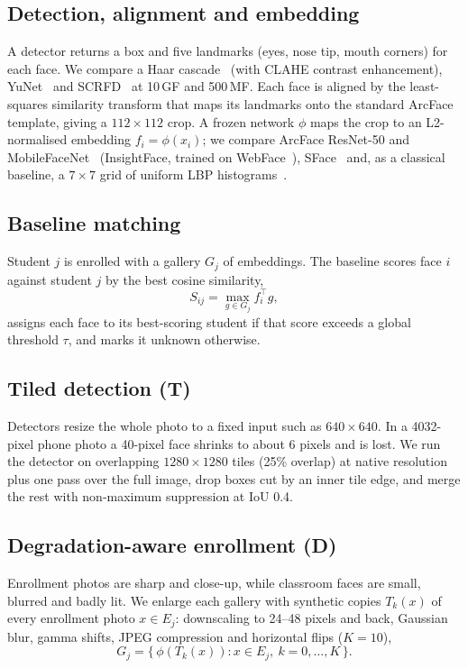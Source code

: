 \documentclass[conference,a4paper]{IEEEtran}
\begin{document}
\subsection{Detection, alignment and embedding}
A detector returns a box and five landmarks (eyes, nose tip, mouth corners) for each face. We compare a Haar cascade~\cite{viola} (with CLAHE contrast enhancement), YuNet~\cite{yunet} and SCRFD~\cite{scrfd} at 10\,GF and 500\,MF. Each face is aligned by the least-squares similarity transform that maps its landmarks onto the standard ArcFace template, giving a $112\times112$ crop. A frozen network $\phi$ maps the crop to an L2-normalised embedding $f_i=\phi(x_i)$; we compare ArcFace ResNet-50 and MobileFaceNet~\cite{arcface,mbf} (InsightFace, trained on WebFace~\cite{webface}), SFace~\cite{sface} and, as a classical baseline, a $7\times7$ grid of uniform LBP histograms~\cite{lbp}.

\subsection{Baseline matching}
Student $j$ is enrolled with a gallery $G_j$ of embeddings. The baseline scores face $i$ against student $j$ by the best cosine similarity,
\begin{equation}
S_{ij} = \max_{g \in G_j} f_i^{\top} g ,
\label{eq:score}
\end{equation}
assigns each face to its best-scoring student if that score exceeds a global threshold $\tau$, and marks it unknown otherwise.

\subsection{Tiled detection (T)}
Detectors resize the whole photo to a fixed input such as $640\times640$. In a 4032-pixel phone photo a 40-pixel face shrinks to about 6 pixels and is lost. We run the detector on overlapping $1280\times1280$ tiles (25\% overlap) at native resolution plus one pass over the full image, drop boxes cut by an inner tile edge, and merge the rest with non-maximum suppression at IoU 0.4.

\subsection{Degradation-aware enrollment (D)}
Enrollment photos are sharp and close-up, while classroom faces are small, blurred and badly lit. We enlarge each gallery with synthetic copies $T_k(x)$ of every enrollment photo $x\in E_j$: downscaling to 24--48 pixels and back, Gaussian blur, gamma shifts, JPEG compression and horizontal flips ($K=10$),
\begin{equation}
G_j = \{\, \phi(T_k(x)) : x \in E_j,\ k=0,\dots,K \,\}.
\end{equation}
\end{document}

